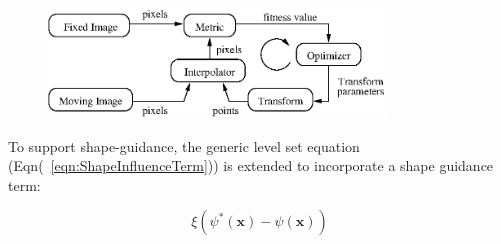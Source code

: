 \documentclass{InsightArticle}
\begin{document}
%
%

\begin{figure}
\center
\includegraphics[width=0.8\textwidth]{RegistrationComponentsDiagram.eps}
\label{fig:RegistrationComponents}
\end{figure}



%
%


To support shape-guidance, the generic level set equation
(Eqn(~\ref{eqn:ShapeInfluenceTerm})) is extended to incorporate a shape guidance
term:

\begin{equation}
\label{eqn:ShapeInfluenceTerm}
\xi \left(\psi^{*}(\mathbf{x}) - \psi(\mathbf{x})\right)
\end{equation}




%
%



\end{document}
